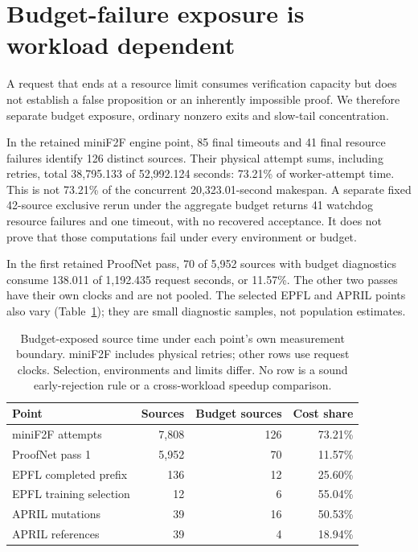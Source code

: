 \documentclass[10pt,twocolumn]{article}
\begin{document}
\section{Budget-failure exposure is workload dependent}
\label{sec:failures}
A request that ends at a resource limit consumes verification capacity but
does not establish a false proposition or an inherently impossible proof.
We therefore separate budget exposure, ordinary nonzero exits and slow-tail
concentration.

In the retained miniF2F engine point, 85 final timeouts and 41 final
resource failures identify 126 distinct sources.
Their physical attempt sums, including retries, total 38,795.133 of
52,992.124 seconds: 73.21\% of worker-attempt time.
This is not 73.21\% of the concurrent 20,323.01-second makespan.
A separate fixed 42-source exclusive rerun under the aggregate budget returns
41 watchdog resource failures and one timeout, with no recovered acceptance.
It does not prove that those computations fail under every environment or
budget.

In the first retained ProofNet pass, 70 of 5,952 sources with budget
diagnostics consume 138.011 of 1,192.435 request seconds, or 11.57\%.
The other two passes have their own clocks and are not pooled.
The selected EPFL and APRIL points also vary (Table~\ref{tab:budget});
they are small diagnostic samples, not population estimates.

\begin{table}[t]
\centering\footnotesize
\setlength{\tabcolsep}{3pt}
\begin{tabular}{@{}lrrr@{}}
\toprule
Point & Sources & Budget sources & Cost share\\
\midrule
miniF2F attempts &7,808&126&73.21\%\\
ProofNet pass 1 &5,952&70&11.57\%\\
EPFL completed prefix &136&12&25.60\%\\
EPFL training selection &12&6&55.04\%\\
APRIL mutations &39&16&50.53\%\\
APRIL references &39&4&18.94\%\\
\bottomrule
\end{tabular}
\caption{Budget-exposed source time under each point's own measurement
boundary. miniF2F includes physical retries; other rows use request clocks.
Selection, environments and limits differ. No row is a sound early-rejection
rule or a cross-workload speedup comparison.}
\label{tab:budget}
\end{table}
\end{document}
